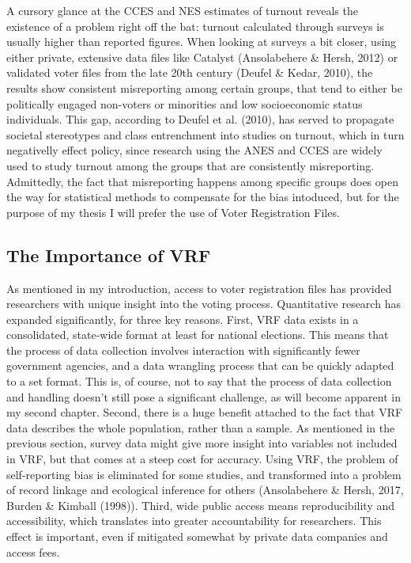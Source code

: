 \documentclass[12pt,twoside]{reedthesis}
\begin{document}
  A cursory glance at the CCES and NES estimates of turnout reveals the
  existence of a problem right off the bat: turnout calculated through
  surveys is usually higher than reported figures. When looking at surveys
  a bit closer, using either private, extensive data files like Catalyst
  (Ansolabehere \& Hersh, 2012) or validated voter files from the late
  20th century (Deufel \& Kedar, 2010), the results show consistent
  misreporting among certain groups, that tend to either be politically
  engaged non-voters or minorities and low socioeconomic status
  individuals. This gap, according to Deufel et al. (2010), has served to
  propagate societal stereotypes and class entrenchment into studies on
  turnout, which in turn negativelly effect policy, since research using
  the ANES and CCES are widely used to study turnout among the groups that
  are consistently misreporting. Admittedly, the fact that misreporting
  happens among specific groups does open the way for statistical methods
  to compensate for the bias intoduced, but for the purpose of my thesis I
  will prefer the use of Voter Registration Files.
  
  \subsection{The Importance of VRF}\label{the-importance-of-vrf}
  
  As mentioned in my introduction, access to voter registration files has
  provided researchers with unique insight into the voting process.
  Quantitative research has expanded significantly, for three key reasons.
  First, VRF data exists in a consolidated, state-wide format at least for
  national elections. This means that the process of data collection
  involves interaction with significantly fewer government agencies, and a
  data wrangling process that can be quickly adapted to a set format. This
  is, of course, not to say that the process of data collection and
  handling doesn't still pose a significant challenge, as will become
  apparent in my second chapter. Second, there is a huge benefit attached
  to the fact that VRF data describes the whole population, rather than a
  sample. As mentioned in the previous section, survey data might give
  more insight into variables not included in VRF, but that comes at a
  steep cost for accuracy. Using VRF, the problem of self-reporting bias
  is eliminated for some studies, and transformed into a problem of record
  linkage and ecological inference for others (Ansolabehere \& Hersh,
  2017, Burden \& Kimball (1998)). Third, wide public access means
  reproducibility and accessibility, which translates into greater
  accountability for researchers. This effect is important, even if
  mitigated somewhat by private data companies and access fees.
  
\end{document}

